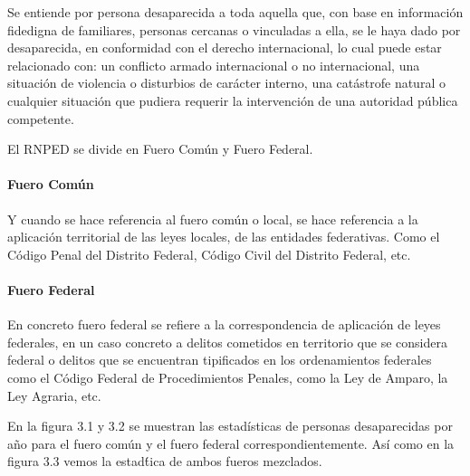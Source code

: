 \justify
Se entiende por persona desaparecida a toda aquella que, con base en información fidedigna de familiares, personas cercanas o vinculadas a ella, se le haya dado por desaparecida, en conformidad con el derecho internacional, lo cual puede estar relacionado con: un conflicto armado internacional o no internacional, una situación de violencia o disturbios de carácter interno, una catástrofe natural o cualquier situación que pudiera requerir la intervención de una autoridad pública competente.


\begin{flushleft}
El RNPED se divide en Fuero Com\'un y Fuero Federal.
\end{flushleft}

\paragraph{Fuero Com\'un}
Y cuando se hace referencia al fuero com\'un o local, se hace referencia a la aplicación territorial de las leyes locales, de las entidades federativas. Como el Código Penal del Distrito Federal, Código Civil del Distrito Federal, etc.

\paragraph{Fuero Federal}
En concreto fuero federal se refiere a la correspondencia de aplicación de leyes federales, en un caso concreto a delitos cometidos en territorio que se considera federal o delitos que se encuentran tipificados en los ordenamientos federales como el Código Federal de Procedimientos Penales, como la Ley de Amparo, la Ley Agraria, etc.

%
%
%
En la figura 3.1 y 3.2 se muestran las estad\'isticas de personas desaparecidas por año para el fuero común y el fuero federal correspondientemente. As\'i como en la figura 3.3 vemos la estad\'tica de ambos fueros mezclados.

